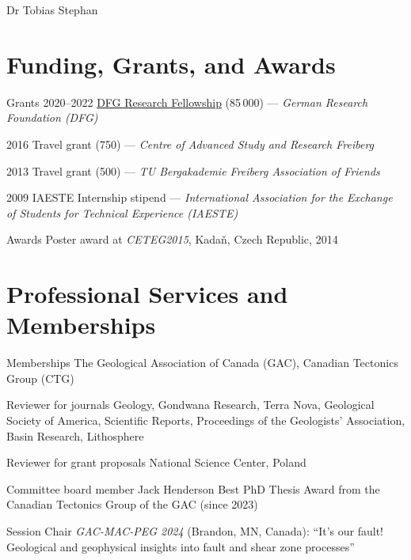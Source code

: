 \documentclass[10pt, paper=letter]{scrartcl} %
\begin{document}
\begin{cv}{\textsf{Dr Tobias Stephan}}
    \section{Funding, Grants, and Awards}
    \begin{cvlist}{}
        \item[Grants] 2020--2022
        \href{https://gepris.dfg.de/gepris/projekt/439621066?language=en}{DFG Research
            Fellowship} (85\,000\texteuro) --- \textit{German Research Foundation (DFG)}
        \item[] 2016 Travel grant (750\texteuro) --- \textit{Centre of Advanced Study and Research Freiberg}
        \item 2013 Travel grant (500\texteuro) --- \textit{TU Bergakademie Freiberg Association of Friends}
        \item 2009 IAESTE Internship stipend --- \textit{International Association for the Exchange of Students for Technical Experience
            (IAESTE)}
        \item[Awards] Poster award at \textit{CETEG2015}, Kada\v{n}, Czech Republic, 2014
    \end{cvlist}

    \section{Professional Services and Memberships}
    \begin{cvlist}{}
        \item[Memberships] The Geological Association of Canada (GAC), Canadian Tectonics
        Group (CTG)%
        \item[Reviewer for journals] Geology, Gondwana Research, Terra Nova, Geological
        Society of America, Scientific Reports, Proceedings of the Geologists'
        Association, Basin Research, Lithosphere
        \item[Reviewer for grant proposals] National Science Center, Poland
        \item[Committee board member] Jack Henderson Best PhD Thesis Award from the Canadian
        Tectonics Group of the GAC (since 2023)
        \item[Session Chair] \textit{GAC-MAC-PEG 2024} (Brandon, MN, Canada): \enquote{It’s
            our fault! Geological and geophysical insights into fault and shear zone
            processes}
    \end{cvlist}


\end{cv}
\end{document}
